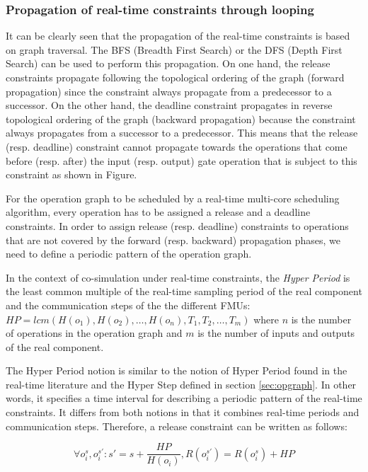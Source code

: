 \subsubsection{Propagation of real-time constraints through looping}

It can be clearly seen that the propagation of the real-time constraints is based on graph traversal. The BFS (Breadth First Search) or the DFS (Depth First Search) can be used to perform this propagation. On one hand, the release constraints propagate following the topological ordering of the graph (forward propagation) since the constraint always propagate from a predecessor to a successor. On the other hand, the deadline constraint propagates in reverse topological ordering of the graph (backward propagation) because the constraint always propagates from a successor to a predecessor. This means that the release (resp. deadline) constraint cannot propagate towards the operations that come before (resp. after) the input (resp. output) gate operation that is subject to this constraint as shown in Figure.

For the operation graph to be scheduled by a real-time multi-core scheduling algorithm, every operation has to be assigned a release and a deadline constraints. In order to assign release (resp. deadline) constraints to operations that are not covered by the forward (resp. backward) propagation phases, we need to define a periodic pattern of the operation graph.

\begin{definition}
In the context of co-simulation under real-time constraints, the \textit{Hyper Period} is the least common multiple of the real-time sampling period of the real component and the communication steps of the the different FMUs: $HP=lcm(H(o_1),H(o_2), \dots ,\allowbreak H(o_n), T_1, T_2, \dots ,T_m)$ where $n$ is the number of operations in the operation graph and $m$ is the number of inputs and outputs of the real component.
\label{def:hyperperiod}
\end{definition}

The Hyper Period notion is similar to the notion of Hyper Period found in the real-time literature and the Hyper Step defined in section \ref{sec:opgraph}. In other words, it specifies a time interval for describing a periodic pattern of the real-time constraints. It differs from both notions in that it combines real-time periods and communication steps. Therefore, a release constraint can be written as follows:

\begin{equation}
\forall o_i^s, o_i^{s'}: s' = s + \frac{HP}{H(o_i)}, R(o_i^{s'}) = R(o_i^s) + HP
\label{eq:release}
\end{equation}

